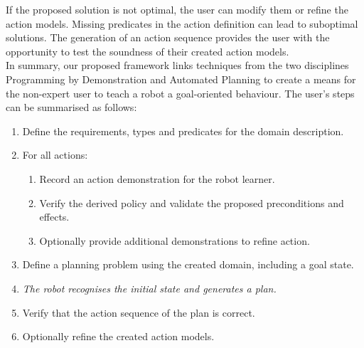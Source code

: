 If the proposed solution is not optimal, the user can modify them or refine the action models.
 Missing predicates in the action definition can lead to suboptimal solutions.
 The generation of an action sequence provides the user with the opportunity to test the soundness of their created action models.\\

\noindent In summary, our proposed framework links techniques from the two disciplines Programming by Demonstration and Automated Planning to create a means for the non-expert user to teach a robot a goal-oriented behaviour.
 The user's steps can be summarised as follows:

\begin{enumerate}
\item Define the requirements, types and predicates for the domain description.
\item For all actions:
\begin{enumerate}
\item Record an action demonstration for the robot learner.
\item Verify the derived policy and validate the proposed preconditions and effects.
\item Optionally provide additional demonstrations to refine action.
\end{enumerate}
\item Define a planning problem using the created domain, including a goal state.
\item \textit{The robot recognises the initial state and generates a plan.}
\item Verify that the action sequence of the plan is correct.
\item Optionally refine the created action models.
\end{enumerate}